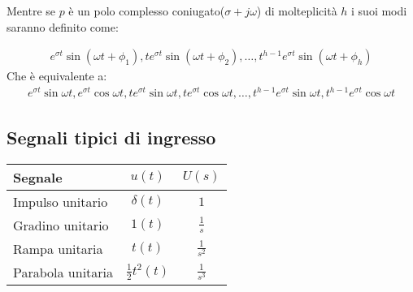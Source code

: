 Mentre se $p$ \`e un polo complesso coniugato($\sigma + j\omega$) di molteplicit\`a $h$ i suoi modi saranno definito come:

\begin{align}
  e^{\sigma t} \sin(\omega t + \phi_1), te^{\sigma t} \sin(\omega t + \phi_2), \dots, t^{h-1}e^{\sigma t} \sin(\omega t + \phi_h)
\end{align}
Che \`e equivalente a:
\begin{align}
  e^{\sigma t} \sin{\omega t}, e^{\sigma t} \cos{\omega t}, te^{\sigma t} \sin{\omega t}, te^{\sigma t} \cos{\omega t}, \dots, t^{h-1}e^{\sigma t} \sin{\omega t}, t^{h-1}e^{\sigma t} \cos{\omega t}
\end{align}

\subsection{Segnali tipici di ingresso}
\begin{center}
\renewcommand{\arraystretch}{1.5}
  \begin{tabular}{|l|c|c|}
    \hline
    Segnale & $u(t)$ & $U(s)$ \\
    \hline
    Impulso unitario & $\delta(t)$ & $1$ \\
    Gradino unitario & $1(t)$ & $\frac{1}{s}$ \\
    Rampa unitaria & $t(t)$ & $\frac{1}{s^2}$ \\
    Parabola unitaria & $\frac{1}{2}t^2(t)$ & $\frac{1}{s^3}$ \\
    \hline
  \end{tabular}
\end{center}

